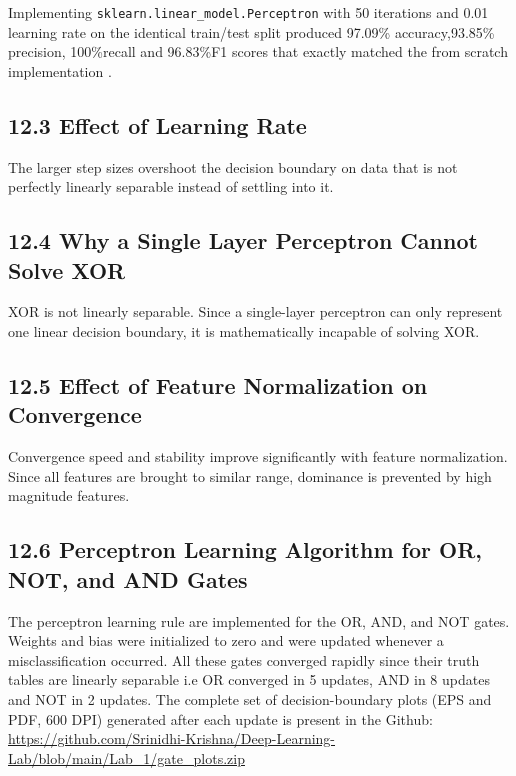 \documentclass[11pt]{article}
\begin{document}
Implementing \texttt{sklearn.linear\_model.Perceptron} with 50 iterations and 0.01 learning rate on the identical train/test split produced 97.09\% accuracy,93.85\% precision, 100\%recall and 96.83\%F1 scores that exactly matched the from scratch implementation .

\vspace{3mm}
\subsection*{12.3 Effect of Learning Rate}

The larger step sizes overshoot the decision boundary on data that is not perfectly linearly separable instead of settling into it.

\vspace{3mm}
\subsection*{12.4 Why a Single Layer Perceptron Cannot Solve XOR}

XOR is not linearly separable. Since a single-layer perceptron can only represent one linear decision boundary, it is mathematically incapable of solving XOR. 


\vspace{3mm}
\subsection*{12.5 Effect of Feature Normalization on Convergence}

Convergence speed and stability improve significantly with feature normalization. Since all features are brought to similar range, dominance is prevented by high magnitude features.

\vspace{3mm}
\subsection*{12.6 Perceptron Learning Algorithm for OR, NOT, and AND Gates}
The perceptron learning rule are implemented for the OR, AND, and NOT gates. Weights and bias were initialized to zero and were updated whenever a misclassification occurred. All these gates converged rapidly since their truth tables are linearly separable i.e OR converged in 5 updates, AND in 8 updates and NOT in 2 updates. The complete set of decision-boundary plots (EPS and PDF, 600 DPI) generated after each update is present in the Github:
\url{https://github.com/Srinidhi-Krishna/Deep-Learning-Lab/blob/main/Lab_1/gate_plots.zip}
\end{document}
